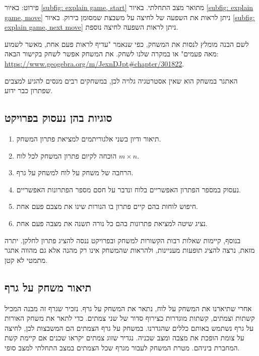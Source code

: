 \documentclass[12pt,leqno]{article}
\theoremstyle{theoremdd}
\begin{document}
פירוט:
באיור
\ref{subfig: explain game, start}
מתואר מצב התחלתי.
באיור 
\ref{subfig: explain game, move}
ניתן לראות 
את השפעה של לחיצה על משבצת שמסומן בירוק.
באיור
\ref{subfig: explain game, next move}
ניתן לראות השפעה לחיצה נוספת.

לשם הבנה מומלץ לנסות את המשחק,
כפי שנאמר "עדיף לראות פעם אחת, מאשר לשמוע מאה פעמים"
או במקרה שלנו לשחק.
את המשחק אפשר לשחק בקישור הבאה:
\\
\url{https://www.geogebra.org/m/JexnDJpt#chapter/301822}.

האתגר במשחק הוא שאין אסטרטגיה גלויה
לכן, במשחקים רבים מנסים להגיע למצבים שפתרון כבר ידוע.

\subsection{סוגיות בהן נעסוק בפרויקט}
\begin{enumerate}
	\item 
תיאור ודיון בשני אלגוריתמים למציאת פתרון המשחק.
	\item 
הוכחה לקיום פתרון המשחק לכל לוח
	$m\times n$.
	\item 
הרחבה של משחק על לוח למשחק על גרף.
    \item 
נעסוק במספר הפתרון האפשריים בלוח ונדבר על חסם מספר הפתרונות האפשריים.
	\item 
חיפוש לוחות בהם קיים פתרון בו הנורות שינו את מצבם פעם אחת.
    \item 
נציג שיטה למציאת פתרונות בהם כל נורה תשנה את מצבה פעם אחת.
\end{enumerate}
בנוסף, קיימות שאלות רבות הקשורות למשחק
ובפרויקט ננסה להציג פתרון לחלקן.
יתרה מזאת, נרצה להציג תופעות מעניינות, ולהראות
שהמשחק אינו רק מהנה אלא גם מהווה אתגר מתמטי לא קטן.

\subsection{תיאור משחק על גרף}
אחרי שתיארנו את המשחק על לוח, נתאר את המשחק על גרף.
נזכיר שגרף זה מבנה המכיל קשתות וצמתים, קשתות מוגדרות כצירוף סדור של שני צמתים.
כדי לתאר את משחק האורות על גרף נשתמש באותם כללים שהגדרנו.
במשחק על גרף הצמתים הם המשבצות
לכן, לחיצה על צומת הופכת את מצבה ומצב שכניה.
נגדיר שזוג צמתים יקראו שכנים אם קיימת
קשת המחברת ביניהם.
מטרת המשחק לעבור מגרף שכל הצמתים במצב התחלתי למצב סופי.
\end{document}
